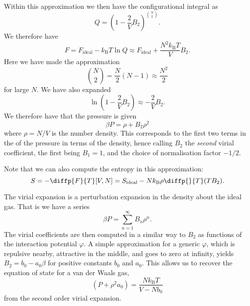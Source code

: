 \documentclass[fleqn]{NotesClass}
\newcommand*{\boltzmann}{k_{\mathrm{B}}}
\begin{document}
    Within this approximation we then have the configurational integral as
    \begin{equation}
        Q = \left( 1 - \frac{2}{V}B_2 \right)^{\binom{N}{2}}.
    \end{equation}
    We therefore have
    \begin{equation}
        F = F_{\mathrm{ideal}} - \boltzmann T \ln Q \approx F_{\mathrm{ideal}} + \frac{N^2 \boltzmann T}{V} B_2.
    \end{equation}
    Here we have made the approximation
    \begin{equation}
        \binom{N}{2} = \frac{N}{2}(N - 1) \approx \frac{N^2}{2}
    \end{equation}
    for large \(N\).
    We have also expanded
    \begin{equation}
        \ln\left( 1 - \frac{2}{V}B_2 \right) \approx -\frac{2}{V}B_2.
    \end{equation}
    We therefore have that the pressure is given
    \begin{equation}
        \beta P = \rho + B_2 \rho^2
    \end{equation}
    where \(\rho = N / V\) is the number density.
    This corresponds to the first two terms in the  of the pressure in terms of the density, hence calling \(B_2\) the \emph{second} virial coefficient, the first being \(B_1 = 1\), and the choice of normalisation factor \(-1/2\).
    
    Note that we can also compute the entropy in this approximation:
    \begin{equation}
        S = -\diffp{F}{T}[V,N] = S_{\mathrm{ideal}} - N\boltzmann \rho \diffp{}{T}(TB_2).
    \end{equation}
    
    The virial expansion is a perturbation expansion in the density about the ideal gas.
    That is we have a series
    \begin{equation}
        \beta P = \sum_{n = 1}^{\infty} B_n \rho^n.
    \end{equation}
    The virial coefficients are then computed in a similar way to \(B_2\) as functions of the interaction potential \(\varphi\).
    A simple approximation for a generic \(\varphi\), which is repulsive nearby, attractive in the middle, and goes to zero at infinity, yields \(B_2 = b_0 - a_0\beta\) for positive constants \(b_0\) and \(a_0\).
    This allows us to recover the equation of state for a van der Waals gas,
    \begin{equation}
        (P + \rho^2 a_0) = \frac{N \boltzmann T}{V - N b_0}
    \end{equation}
    from the second order virial expansion.
    
\end{document}
